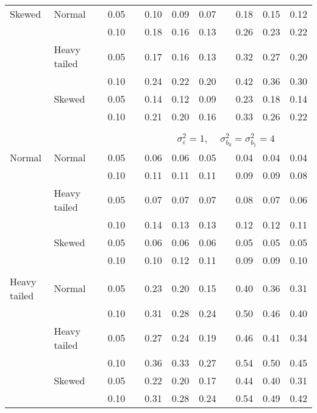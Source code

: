 \begin{table}[ht]
\begin{scriptsize}
\begin{tabular}{ll p{.1cm} c p{.1cm} rrr p{.1cm} rrr}
Skewed       & Normal       && 0.05 &&  0.10 & 0.09 & 0.07 && 0.18 & 0.15 & 0.12 \\ 
             &              && 0.10 &&  0.18 & 0.16 & 0.13 && 0.26 & 0.23 & 0.22 \\ 
             & Heavy tailed && 0.05 &&  0.17 & 0.16 & 0.13 && 0.32 & 0.27 & 0.20 \\ 
             &              && 0.10 &&  0.24 & 0.22 & 0.20 && 0.42 & 0.36 & 0.30 \\ 
             & Skewed       && 0.05 &&  0.14 & 0.12 & 0.09 && 0.23 & 0.18 & 0.14 \\ 
             &              && 0.10 &&  0.21 & 0.20 & 0.16 && 0.33 & 0.26 & 0.22 \\ 


&&&&&&&&&&&\\
& && && \multicolumn{7}{c}{$\sigma_{\varepsilon}^2 = 1$, \ \ $\sigma_{b_0}^2 = \sigma_{b_1}^2 = 4$} \\ \cline{6-12}
\rowcolor{gray!20}Normal       & Normal       && 0.05 &&  0.06 & 0.06 & 0.05 && 0.04 & 0.04 & 0.04 \\ 
\rowcolor{gray!20}             &              && 0.10 &&  0.11 & 0.11 & 0.11 && 0.09 & 0.09 & 0.08 \\ 
\rowcolor{gray!20}             & Heavy tailed && 0.05 &&  0.07 & 0.07 & 0.07 && 0.08 & 0.07 & 0.06 \\ 
\rowcolor{gray!20}             &              && 0.10 &&  0.14 & 0.13 & 0.13 && 0.12 & 0.12 & 0.11 \\ 
\rowcolor{gray!20}             & Skewed       && 0.05 &&  0.06 & 0.06 & 0.06 && 0.05 & 0.05 & 0.05 \\ 
\rowcolor{gray!20}             &              && 0.10 &&  0.10 & 0.12 & 0.11 && 0.09 & 0.09 & 0.10 \\ 
             &&&&&&&&&&&\\
Heavy tailed & Normal       && 0.05 &&  0.23 & 0.20 & 0.15 && 0.40 & 0.36 & 0.31 \\ 
             &              && 0.10 &&  0.31 & 0.28 & 0.24 && 0.50 & 0.46 & 0.40 \\ 
             & Heavy tailed && 0.05 &&  0.27 & 0.24 & 0.19 && 0.46 & 0.41 & 0.34 \\ 
             &              && 0.10 &&  0.36 & 0.33 & 0.27 && 0.54 & 0.50 & 0.45 \\ 
             & Skewed       && 0.05 &&  0.22 & 0.20 & 0.17 && 0.44 & 0.40 & 0.31 \\ 
             &              && 0.10 &&  0.31 & 0.28 & 0.24 && 0.54 & 0.49 & 0.42 \\ 

\end{tabular}
\end{scriptsize}
\end{table}
